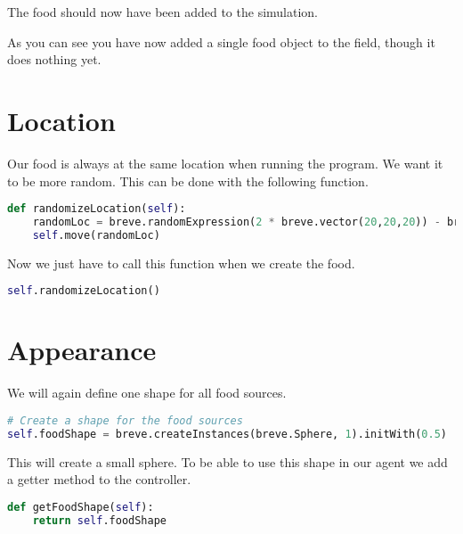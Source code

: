 
The food should now have been added to the simulation.

As you can see you have now added a single food object to the field, though it does nothing yet.

\section{Location}
Our food is always at the same location when running the program. We want it to be more random. This can be done with the following function.
\begin{fullwidth}
\begin{lstlisting}[language=Python]
def randomizeLocation(self):
    randomLoc = breve.randomExpression(2 * breve.vector(20,20,20)) - breve.vector(20,20,20)
    self.move(randomLoc)
\end{lstlisting}
\end{fullwidth}

Now we just have to call this function when we create the food.
\begin{lstlisting}[language=Python]
self.randomizeLocation()
\end{lstlisting}


\section{Appearance}
We will again define one shape for all food sources.

\begin{fullwidth}
\begin{lstlisting}[language=Python]
# Create a shape for the food sources
self.foodShape = breve.createInstances(breve.Sphere, 1).initWith(0.5)
\end{lstlisting}
\end{fullwidth}
This will create a small sphere. To be able to use this shape in our agent we add a getter method to the controller.

\begin{lstlisting}[language=Python]
def getFoodShape(self):
    return self.foodShape
\end{lstlisting}

